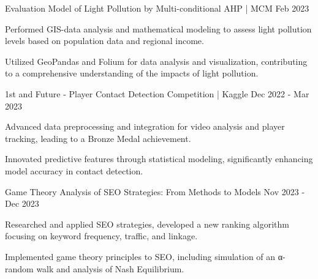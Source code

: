 

\begin{cventries}

  \cventry
    {Evaluation Model of Light Pollution by Multi-conditional AHP | MCM} %
    {Feb 2023} %
    {
      \begin{cvitems} %
        \item {Performed GIS-data analysis and mathematical modeling to assess light pollution levels based on population data and regional income.}
        \item {Utilized GeoPandas and Folium for data analysis and visualization, contributing to a comprehensive understanding of the impacts of light pollution.}
      \end{cvitems}
    }

  \cventry
    {1st and Future - Player Contact Detection Competition | Kaggle} %
    {Dec 2022 - Mar 2023} %
    {
      \begin{cvitems} %
        \item {Advanced data preprocessing and integration for video analysis and player tracking, leading to a Bronze Medal achievement.}
        \item {Innovated predictive features through statistical modeling, significantly enhancing model accuracy in contact detection.}
      \end{cvitems}
    }

  \cventry
    {Game Theory Analysis of SEO Strategies: From Methods to Models} %
    {Nov 2023 - Dec 2023} %
    {
      \begin{cvitems} %
        \item {Researched and applied SEO strategies, developed a new ranking algorithm focusing on keyword frequency, traffic, and linkage.}
        \item {Implemented game theory principles to SEO, including simulation of an α-random walk and analysis of Nash Equilibrium.}
      \end{cvitems}
    }


\end{cventries}
